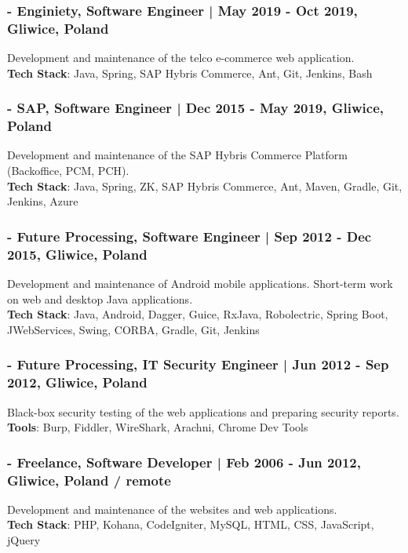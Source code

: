 \documentclass[8pt]{extarticle}
\begin{document}
      \subsubsection*{\normalsize{- Enginiety, Software Engineer | May 2019 - Oct 2019, Gliwice, Poland}}
      Development and maintenance of the telco e-commerce web application.\\
      \textbf{Tech Stack}: Java, Spring, SAP Hybris Commerce, Ant, Git, Jenkins, Bash

      \subsubsection*{\normalsize{- SAP, Software Engineer | Dec 2015 - May 2019, Gliwice, Poland}}
      Development and maintenance of the SAP Hybris Commerce Platform (Backoffice, PCM, PCH).\\
      \textbf{Tech Stack}: Java, Spring, ZK, SAP Hybris Commerce, Ant, Maven, Gradle, Git, Jenkins, Azure

      \subsubsection*{\normalsize{- Future Processing, Software Engineer | Sep 2012 - Dec 2015, Gliwice, Poland}}
      Development and maintenance of Android mobile applications. Short-term work on web and desktop Java applications.\\
      \textbf{Tech Stack}: Java, Android, Dagger, Guice, RxJava, Robolectric, Spring Boot, JWebServices,
      Swing, CORBA, Gradle, Git, Jenkins

      \subsubsection*{\normalsize{- Future Processing, IT Security Engineer | Jun 2012 - Sep 2012, Gliwice, Poland}}
      Black-box security testing of the web applications and preparing security reports.\\
      \textbf{Tools}: Burp, Fiddler, WireShark, Arachni, Chrome Dev Tools

      \subsubsection*{\normalsize{- Freelance, Software Developer | Feb 2006 - Jun 2012, Gliwice, Poland / remote}}
      Development and maintenance of the websites and web applications.\\
      \textbf{Tech Stack}: PHP, Kohana, CodeIgniter, MySQL, HTML, CSS, JavaScript, jQuery
\end{document}
